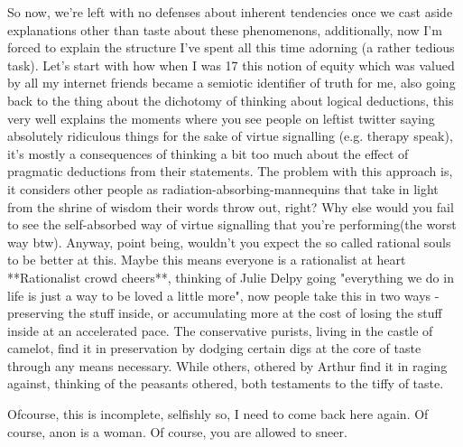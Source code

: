 So now, we're left with no defenses about inherent tendencies once we cast aside explanations other than taste about these phenomenons, additionally, now I'm forced to explain the structure I've spent all this time adorning (a rather tedious task). Let's start with how when I was 17 this notion of equity which was valued by all my internet friends became a semiotic identifier of truth for me, also going back to the thing about the dichotomy of thinking about logical deductions, this very well explains the moments where you see people on leftist twitter saying absolutely ridiculous things for the sake of virtue signalling (e.g. therapy speak), it's mostly a consequences of thinking a bit too much about the effect of pragmatic deductions from their statements. The problem with this approach is, it considers other people as radiation-absorbing-mannequins that take in light from the shrine of wisdom their words throw out, right? Why else would you fail to see the self-absorbed way of virtue signalling that you're performing(the worst way btw). Anyway, point being, wouldn't you expect the so called rational souls to be better at this. Maybe this means everyone is a rationalist at heart **Rationalist crowd cheers**, thinking of Julie Delpy going "everything we do in life is just a way to be loved a little more", now people take this in two ways - preserving the stuff inside, or accumulating more at the cost of losing the stuff inside at an accelerated pace. The conservative purists, living in the castle of camelot, find it in preservation by dodging certain digs at the core of taste through any means necessary. While others, othered by Arthur find it in raging against, thinking of the peasants othered, both testaments to the tiffy of taste.

Ofcourse, this is incomplete, selfishly so, I need to come back here again. Of course, anon is a woman. Of course, you are allowed to sneer.